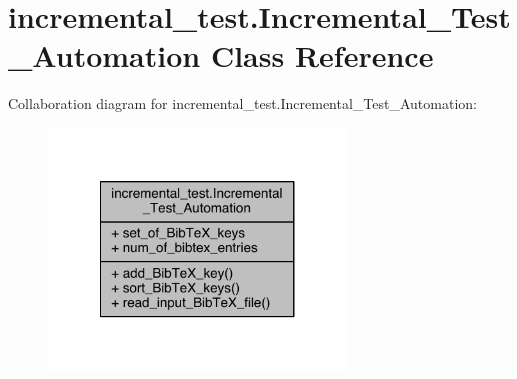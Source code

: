 \hypertarget{classincremental__test_1_1Incremental__Test__Automation}{}\section{incremental\+\_\+test.\+Incremental\+\_\+\+Test\+\_\+\+Automation Class Reference}
\label{classincremental__test_1_1Incremental__Test__Automation}


Collaboration diagram for incremental\+\_\+test.\+Incremental\+\_\+\+Test\+\_\+\+Automation\+:
\nopagebreak
\begin{figure}[H]
\begin{center}
\leavevmode
\includegraphics[width=224pt]{d3/d8e/classincremental__test_1_1Incremental__Test__Automation__coll__graph}
\end{center}
\end{figure}
